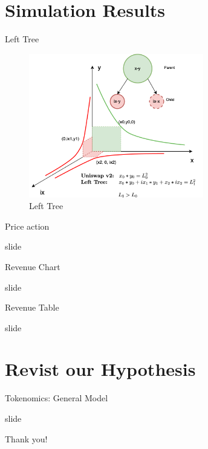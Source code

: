 \documentclass[10pt,xcolor=svgnames]{beamer} %
\begin{document}
\section{Simulation Results}

\begin{frame}{Left Tree}

\begin{figure}[h!]
\includegraphics[width=3in]{img/left_tree.png}
\caption{Left Tree} 
\label{fig:left_tree}
\end{figure}

\end{frame}


\begin{frame}{Price action}

slide

\end{frame}


\begin{frame}{Revenue Chart}

slide

\end{frame}


\begin{frame}{Revenue Table}

slide

\end{frame}


\section{Revist our Hypothesis}

\begin{frame}{Tokenomics: General Model}

slide

\end{frame}






\begin{frame}[standout]
  Thank you! 
\end{frame}
\end{document}
